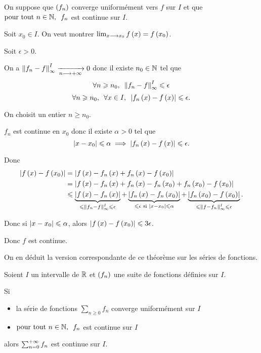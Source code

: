 \begin{dem}
On suppose que \(\left(f_n\right)\) converge uniformément vers \(f\) sur \(I\) et que \(\quantifs{\tpt n\in\N}f_n\) est continue sur \(I\).

Soit \(x_0\in I\). On veut montrer \(\lim_{x\longrightarrow x_0}f\left(x\right)=f\left(x_0\right)\).

Soit \(\epsilon>0\).

On a \(\norme{f_n-f}_\infty^I\tendqd{n\to\pinf}0\) donc il existe \(n_0\in\mathbb{N}\) tel que \[\quantifs{\forall n\geq n_0}\norme{f_n-f}_\infty^I\leq\epsilon\] \ie \[\quantifs{\forall n\geq n_0;\forall x\in I}\abs{f_n\paren{x}-f\paren{x}}\leq\epsilon.\]

On choisit un entier \(n\geq n_0\).

\(f_n\) est continue en \(x_0\) donc il existe \(\alpha>0\) tel que \[\left\lvert x-x_0\right\rvert\leqslant\alpha\implies\left\lvert f_n\left(x\right)-f\left(x\right)\right\rvert\leqslant\epsilon.\]

Donc \[\begin{aligned}
\abs{f\paren{x}-f\paren{x_0}}&=\abs{f\paren{x}-f_n\paren{x}+f_n\paren{x}-f\paren{x_0}} \\
&=\abs{f\paren{x}-f_n\paren{x}+f_n\paren{x}-f_n\paren{x_0}+f_n\paren{x_0}-f\paren{x_0}} \\
&\leq\underbrace{\abs{f\paren{x}-f_n\paren{x}}}_{\leq\norme{f_n-f}_\infty^I\leq\epsilon}+\underbrace{\abs{f_n\paren{x}-f_n\paren{x_0}}}_{\leq\epsilon\text{ si }\abs{x-x_0}\leq\alpha}+\underbrace{\abs{f_n\paren{x_0}-f\paren{x_0}}}_{\leq\norme{f-f_n}_\infty^I\leq\epsilon}.
\end{aligned}\]

Donc si \(\left\lvert x-x_0\right\rvert\leqslant\alpha\), alors \(\left\lvert f\left(x\right)-f\left(x_0\right)\right\rvert\leqslant3\epsilon\).

Donc \(f\) est continue.
\end{dem}

On en déduit la version correspondante de ce théorème sur les séries de fonctions.

\begin{cor}
Soient \(I\) un intervalle de \(\mathbb{R}\) et \(\left(f_n\right)\) une suite de fonctions définies sur \(I\).

Si

\begin{itemize}
    \item la série de fonctions \(\sum_{n\geq0}f_n\) converge uniformément sur \(I\) \\
    \item \(\quantifs{\tpt n\in\N}f_n\) est continue sur \(I\)
\end{itemize}

alors \(\sum_{n=0}^{+\infty}f_n\) est continue sur \(I\).
\end{cor}

